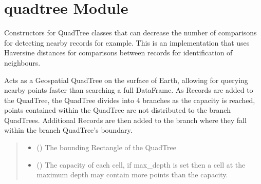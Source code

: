 \documentclass[letterpaper,10pt,english]{sphinxmanual}
\begin{document}
\section{quadtree Module}
\label{\detokenize{quadtree:module-geotrees.quadtree}}\label{\detokenize{quadtree:quadtree-module}}
\sphinxAtStartPar
Constructors for QuadTree classes that can decrease the number of comparisons
for detecting nearby records for example. This is an implementation that uses
Haversine distances for comparisons between records for identification of
neighbours.

\begin{fulllineitems}
\label{\detokenize{quadtree:geotrees.quadtree.QuadTree}}
\pysigstartsignatures
\pysiglinewithargsret
{}
{\sphinxparamcomma {}\sphinxparamcomma {}\sphinxparamcomma {}}
{}
\pysigstopsignatures
\sphinxAtStartPar
Acts as a Geo\sphinxhyphen{}spatial QuadTree on the surface of Earth, allowing
for querying nearby points faster than searching a full DataFrame. As
Records are added to the QuadTree, the QuadTree divides into 4 branches as
the capacity is reached, points contained within the QuadTree are not
distributed to the branch QuadTrees. Additional Records are then added to
the branch where they fall within the branch QuadTree’s boundary.
\begin{quote}\begin{description}
\begin{itemize}
\item {}
\sphinxAtStartPar
{} ({\hyperref[\detokenize{shape:geotrees.shape.Rectangle}]{}}) \textendash{} The bounding Rectangle of the QuadTree

\item {}
\sphinxAtStartPar
{} () \textendash{} The capacity of each cell, if max\_depth is set then a cell at the
maximum depth may contain more points than the capacity.


\end{itemize}
\end{description}
\end{quote}
\end{fulllineitems}
\end{document}
